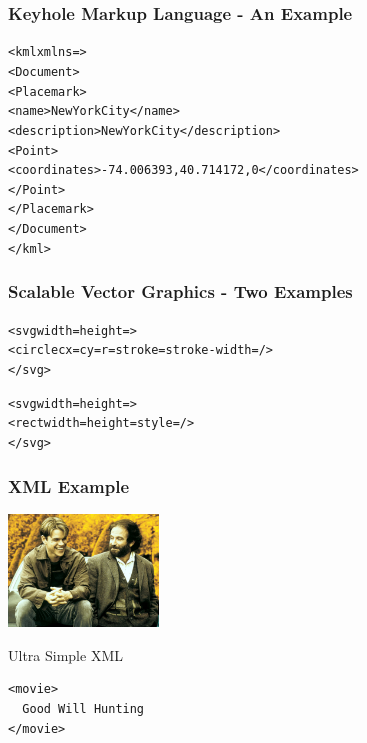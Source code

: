 \documentclass[svgnames]{beamer}
\begin{document}

\begin{frame}[fragile]
\frametitle{Keyhole Markup Language - An Example}

\begin{knitrout}\footnotesize
{}\color{fgcolor}\begin{kframe}
\begin{alltt}
<kml xmlns=>
<Document>
<Placemark>
  <name>New York City</name>
  <description>New York City</description>
  <Point>
    <coordinates>-74.006393,40.714172,0</coordinates>
  </Point>
</Placemark>
</Document>
</kml>
\end{alltt}
\end{kframe}
\end{knitrout}

\end{frame}


\begin{frame}[fragile]
\frametitle{Scalable Vector Graphics - Two Examples}

\begin{knitrout}\scriptsize
{}\color{fgcolor}\begin{kframe}
\begin{alltt}
<svg width= height=>
  <circle cx= cy= r= stroke= stroke-width= />
</svg>
  
  
<svg width= height=>
  <rect width= height= style= />
</svg>
\end{alltt}
\end{kframe}
\end{knitrout}

\end{frame}


\begin{frame}[fragile]
\frametitle{XML Example}

\begin{center}
\includegraphics[width=4cm]{goodwillhunting.jpg}
\end{center}
\begin{block}{Ultra Simple XML}
{\Large \begin{verbatim}
<movie>
  Good Will Hunting
</movie>
\end{verbatim}
}
\end{block}

\end{frame}
\end{document}
